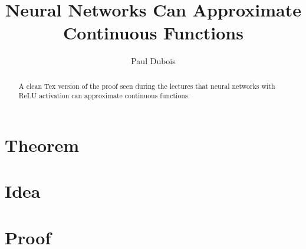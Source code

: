 \documentclass[]{article}
\title{Neural Networks Can Approximate Continuous Functions}
\author{Paul Dubois}
\date{}
\begin{document}
	
	\maketitle
	
	\begin{abstract}
		A clean Tex version of the proof seen during the lectures that neural networks with ReLU activation can approximate continuous functions.
	\end{abstract}
	
	\section{Theorem}
	
	\section{Idea}
	
	\section{Proof}
	
	
\end{document}
